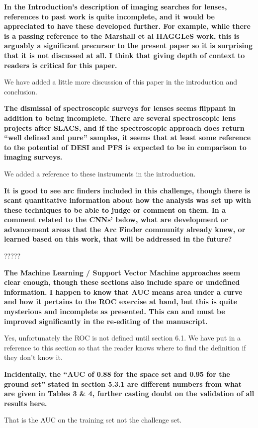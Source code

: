 \documentclass[11pt,a4paper]{article}
\begin{document}
{\bf
In the Introduction’s description of imaging searches for lenses, references to past work is quite incomplete, and it would be appreciated to have these developed further.  For example, while there is a passing reference to the Marshall et al HAGGLeS work, this is arguably a significant precursor to the present paper so it is surprising that it is not discussed at all.  I think that giving depth of context to readers is critical for this paper. 
}

We have added a little more discussion of this paper in the introduction and conclusion.

{\bf
The dismissal of spectroscopic surveys for lenses seems flippant in addition to being incomplete. There are several spectroscopic lens projects after SLACS, and if the spectroscopic approach does return “well defined and pure” samples, it seems that at least some reference to the potential of DESI and PFS is expected to be in comparison to imaging surveys. 
}

We added a reference to these instruments in the introduction.

{\bf
It is good to see arc finders included in this challenge, though there is scant quantitative information about how the analysis was set up with these techniques to be able to judge or comment on them. In a comment related to the CNNs’ below, what are development or advancement areas that the Arc Finder community already knew, or learned based on this work, that will be addressed in the future?  
}

?????

{\bf
The Machine Learning / Support Vector Machine approaches seem clear enough, though these sections also include spare or undefined information.  I happen to know that AUC means area under a curve and how it pertains to the ROC exercise at hand, but this is quite mysterious and incomplete as presented. This can and must be improved significantly in the re-editing of the manuscript.}

Yes, unfortunately the ROC is not defined until section 6.1.  We have put in a reference to this section so that the reader knows where to find the definition if they don't know it.

{\bf Incidentally, the “AUC of 0.88 for the space set and 0.95 for the ground set” stated in section 5.3.1 are different numbers from what are given in Tables 3 \& 4, further casting doubt on the validation of all results here.  
}

That is the AUC on the training set not the challenge set.
\end{document}
